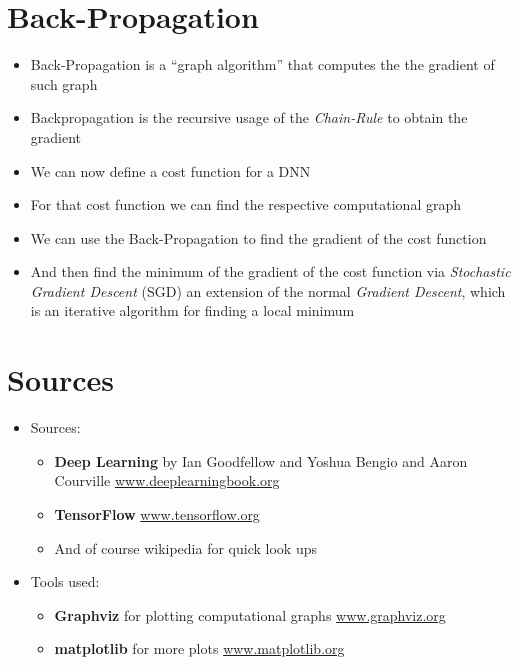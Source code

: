 \documentclass[t]{beamer} %
\begin{document}
\section{Back-Propagation}
\begin{frame}
    \begin{itemize}[<+->]
        \item Back-Propagation is a \enquote{graph algorithm} that computes the the gradient of such graph
        \item Backpropagation is the recursive usage of the \emph{Chain-Rule} to obtain the gradient \newline
        \item We can now define a cost function for a DNN
        \item For that cost function we can find the respective computational graph
        \item We can use the Back-Propagation to find the gradient of the cost function
        \item And then find the minimum of the gradient of the cost function via \emph{Stochastic Gradient Descent} (SGD) an extension of the normal \emph{Gradient Descent}, which is an iterative algorithm for finding a local minimum
    \end{itemize}
\end{frame}

\section{Sources}
\begin{frame}
    \begin{itemize}[<+->]
        \item Sources:
        \begin{itemize}[<+->]
            \item \textbf{Deep Learning} by Ian Goodfellow and Yoshua Bengio and Aaron Courville \newline
            \href{https://www.deeplearningbook.org}{www.deeplearningbook.org}
            \item \textbf{TensorFlow} \newline
            \href{https://www.tensorflow.org}{www.tensorflow.org}
            \item And of course wikipedia for quick look ups \newline
            
        \end{itemize}
        \item Tools used:
        \begin{itemize}[<+->]
            \item \textbf{Graphviz} for plotting computational graphs \newline
            \href{https://graphviz.org}{www.graphviz.org}
            \item \textbf{matplotlib} for more plots \newline
            \href{https://matplotlib.org}{www.matplotlib.org}
        \end{itemize}
    \end{itemize}
\end{frame}
\end{document}
